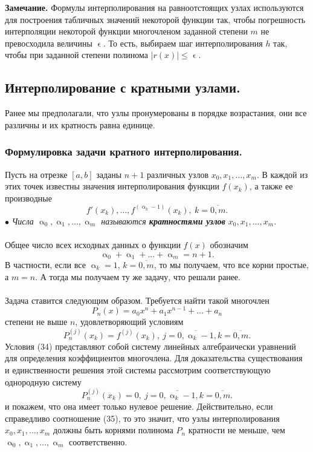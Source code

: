 \documentclass[a4paper, 12pt]{report}
\numberwithin{equation}{section}
\renewcommand{\leq}{\leqslant}
\renewcommand{\alpha}{\upalpha}
\renewcommand{\varepsilon}{\upvarepsilon}
\begin{document}
	\textbf{Замечание.} Формулы интерполирования на равноотстоящих узлах используются для построения табличных значений некоторой функции так, чтобы погрешность интерполяции некоторой функции многочленом заданной степени $m$ не превосходила величины $\varepsilon$. То есть, выбираем шаг интерполирования $h$ так, чтобы при заданной степени полинома $|r(x)| \leq \varepsilon$.
	\subsection{Интерполирование с кратными узлами.}
	Ранее мы предполагали, что узлы пронумерованы в порядке возрастания, они все различны и их кратность равна единице.
	\subsubsection{Формулировка задачи кратного интерполирования.}
	Пусть на отрезке $[a,b]$ заданы $n+1$ различных узлов $x_0, x_1,\ldots, x_m$. В каждой из этих точек известны значения интерполирования функции $f(x_k)$, а также ее производные $$f'(x_k),\ldots, f^{(\alpha _ k -1)}(x_k),\ k=\overline{0,m}.$$
	$\bullet$ \textit{Числа $\alpha_0,\alpha_1,\ldots, \alpha _m$ называются \textbf{кратностями узлов} $x_0,x_1,\ldots, x_m$.}\\\\
	Общее число всех исходных данных о функции $f(x)$ обозначим $$\alpha_0 + \alpha_1 + \ldots + \alpha_m = n+1.$$
	В частности, если все $\alpha_k = 1$, $k=\overline{0,m}$, то мы получаем, что все корни простые, а $m=n$. А тогда мы получаем ту же задачу, что решали ранее.\\\\
	Задача ставится следующим образом. Требуется найти такой многочлен $$P_n(x) = a_0x^n + a_1x^{n-1} + \ldots + a_n$$
	 степени не выше $n$, удовлетворяющий условиям \begin{equation}
	 	P^{(j)}_n(x_k) = f^{(j)}(x_k),\ j =\overline{0,\alpha_k-1}, k = \overline{0,m}.
	 \end{equation}
	 Условия (34) представляют собой систему линейных алгебраически уравнений для определения коэффициентов многочлена. Для доказательства существования и единственности решения этой системы рассмотрим соответствующую однородную систему 
	 \begin{equation}
	 	P_n^{(j)}(x_k) = 0,\ j =\overline{0,\alpha_k-1}, k = \overline{0,m}.
	 \end{equation} и покажем, что она имеет только нулевое решение. Действительно, если справедливо соотношение (35), то это значит, что узлы интерполирования $x_0,x_1,\ldots, x_{m}$ должны быть корнями полинома $P_n$ кратности не меньше, чем $\alpha_0,\alpha_1,\ldots, \alpha_m$ соответственно.
\end{document}
